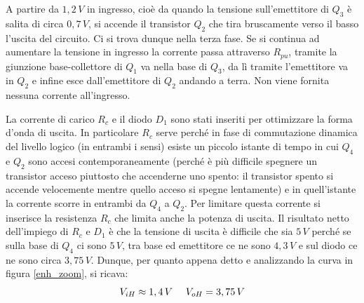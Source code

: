 \documentclass[12pt, a4paper]{report}
\begin{document}
A partire da $1,2\,V$ in ingresso, cioè da quando la tensione sull'emettitore di $Q_3$ è salita di circa $0,7\,V$, si accende il transistor $Q_2$ che tira bruscamente verso il basso l'uscita del circuito. Ci si trova dunque nella terza fase. Se si continua ad aumentare la tensione in ingresso la corrente passa attraverso $R_{pu}$, tramite la giunzione base-collettore di $Q_1$ va nella base di $Q_3$, da lì tramite l'emettitore va in $Q_2$ e infine esce dall'emettitore di $Q_2$ andando a terra. Non viene fornita nessuna corrente all'ingresso.

La corrente di carico $R_c$ e il diodo $D_1$ sono stati inseriti per ottimizzare la forma d'onda di uscita. In particolare $R_c$ serve perché in fase di commutazione dinamica del livello logico (in entrambi i sensi) esiste un piccolo istante di tempo in cui $Q_4$ e $Q_2$ sono accesi contemporaneamente (perché è più difficile spegnere un transistor acceso piuttosto che accenderne uno spento: il transistor spento si accende velocemente mentre quello acceso si spegne lentamente) e in quell'istante la corrente scorre in entrambi da $Q_4$ a $Q_2$. Per limitare questa corrente si inserisce la resistenza $R_c$ che limita anche la potenza di uscita. Il risultato netto dell'impiego di $R_c$ e $D_1$ è che la tensione di uscita è difficile che sia $5\,V$ perché se sulla base di $Q_4$ ci sono $5\,V$, tra base ed emettitore ce ne sono $4,3\,V$ e sul diodo ce ne sono circa $3,75\,V$. Dunque, per quanto appena detto e analizzando la curva in figura \ref{enh_zoom}, si ricava:
\begin{equation}
    V_{iH} \approx 1,4\,V \text{ \, \, } V_{oH} = 3,75\,V
    \label{v_h}
\end{equation}
\end{document}
